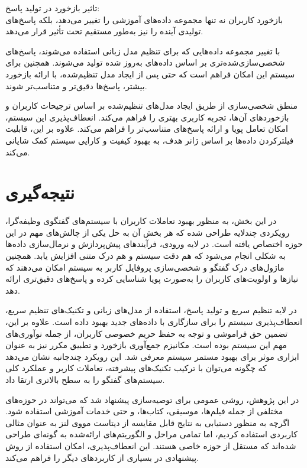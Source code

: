 \begin{enumerate}
تاثیر بازخورد در تولید پاسخ:\\
بازخورد کاربران نه تنها مجموعه داده‌های آموزشی را تغییر می‌دهد، بلکه پاسخ‌های تولیدی آینده را نیز به‌طور مستقیم تحت تأثیر قرار می‌دهد.

با تغییر مجموعه داده‌هایی که برای تنظیم مدل زبانی استفاده می‌شوند، پاسخ‌های شخصی‌سازی‌شده‌تری بر اساس داده‌های به‌روز شده تولید می‌شوند.
همچنین برای سیستم این امکان فراهم است که حتی پس از ایجاد مدل تنظیم‌شده، با ارائه بازخورد بیشتر، پاسخ‌ها دقیق‌تر و متناسب‌تر شوند.

منطق شخصی‌سازی از طریق ایجاد مدل‌های تنظیم‌شده بر اساس ترجیحات کاربران و بازخوردهای آن‌ها، تجربه کاربری بهتری را فراهم می‌کند. انعطاف‌پذیری این سیستم، امکان تعامل پویا و ارائه پاسخ‌های متناسب‌تر را فراهم می‌کند. علاوه بر این، قابلیت فیلترکردن داده‌ها بر اساس ژانر هدف، به بهبود کیفیت و کارایی سیستم کمک شایانی می‌کند.

\end{enumerate}


\section{نتیجه‌گیری}
در این بخش، به منظور بهبود تعاملات کاربران با سیستم‌های گفتگوی وظیفه‌گرا، رویکردی چندلایه طراحی شده که هر بخش آن به حل یکی از چالش‌های مهم در این حوزه اختصاص یافته است. در لایه ورودی، فرآیندهای پیش‌پردازش و نرمال‌سازی داده‌ها به شکلی انجام می‌شود که هم دقت سیستم و هم درک متنی افزایش یابد. همچنین ماژول‌های درک گفتگو و شخصی‌سازی پروفایل کاربر به سیستم امکان می‌دهند که نیازها و اولویت‌های کاربران را به‌صورت پویا شناسایی کرده و پاسخ‌های دقیق‌تری ارائه دهد.

در لایه تنظیم سریع و تولید پاسخ، استفاده از مدل‌های زبانی و تکنیک‌های تنظیم سریع، انعطاف‌پذیری سیستم را برای سازگاری با داده‌های جدید بهبود داده است. علاوه بر این، تضمین حق فراموشی و توجه به حفظ حریم خصوصی کاربران، از جمله نوآوری‌های مهم این سیستم بوده است. مکانیزم جمع‌آوری بازخورد و تطبیق مکرر نیز به عنوان ابزاری موثر برای بهبود مستمر سیستم معرفی شد. این رویکرد چندجانبه نشان می‌دهد که چگونه می‌توان با ترکیب تکنیک‌های پیشرفته، تعاملات کاربر و عملکرد کلی سیستم‌های گفتگو را به سطح بالاتری ارتقا داد.

در این پژوهش، روشی عمومی برای توصیه‌سازی پیشنهاد شد که می‌تواند در حوزه‌های مختلفی از جمله فیلم‌ها، موسیقی، کتاب‌ها، و حتی خدمات آموزشی استفاده شود. اگرچه به منظور دستیابی به نتایج قابل مقایسه از دیتاست مووی لنز به عنوان مثالی کاربردی استفاده کردیم، اما تمامی مراحل و الگوریتم‌های ارائه‌شده به گونه‌ای طراحی شده‌اند که مستقل از حوزه خاصی هستند. این انعطاف‌پذیری، امکان استفاده از روش پیشنهادی در بسیاری از کاربردهای دیگر را فراهم می‌کند.

